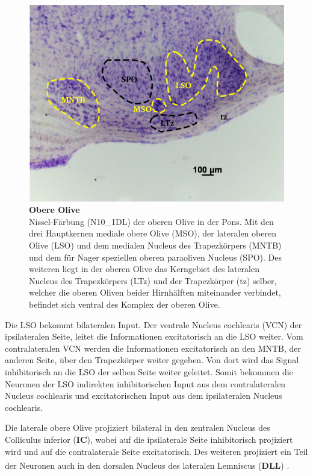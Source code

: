 \documentclass[12pt,a4paper,pdftex]{article}
\begin{document}
\begin{figure}[H]
    \centering
    \includegraphics{pictures/auditory/obere_olive.png}
    \caption[Obere Olive]{\textbf{Obere Olive}\\
    Nissel-Färbung (N10\_1DL) der oberen Olive in der Pons. Mit den drei Hauptkernen mediale obere Olive (MSO), der lateralen oberen Olive (LSO) und dem medialen Nucleus des Trapezkörpers (MNTB) und dem für Nager speziellen oberen paraoliven Nucleus (SPO). Des weiteren liegt in der oberen Olive das Kerngebiet des lateralen Nucleus des Trapezkörpers (LTz) und der Trapezkörper (tz) selber, welcher die oberen Oliven beider Hirnhälften miteinander verbindet, befindet sich ventral des Komplex der oberen Olive.}
    \label{fig:obere_Olive}
\end{figure}

Die LSO bekommt bilateralen Input. Der ventrale Nucleus cochlearis (VCN) der ipsilateralen Seite, leitet die Informationen excitatorisch an die LSO weiter. Vom contralateralen VCN werden die Informationen excitatorisch an den MNTB, der anderen Seite, über den Trapezkörper weiter gegeben. Von dort wird das Signal inhibitorisch an die LSO der selben Seite weiter geleitet.
Somit bekommen die Neuronen der LSO indirekten inhibitorischen Input aus dem contralateralen Nucleus cochlearis und excitatorischen Input aus dem ipsilateralen Nucleus cochlearis.

Die laterale obere Olive projiziert bilateral in den zentralen Nucleus des Colliculus inferior (\textbf{IC}), wobei auf die ipsilaterale Seite inhibitorisch projiziert wird und auf die contralaterale Seite excitatorisch.
Des weiteren projiziert ein Teil der Neuronen auch in den dorsalen Nucleus des lateralen Lemniscus (\textbf{DLL}) \textsuperscript{\cite[29]{paxinos2014rat}}.
\end{document}
